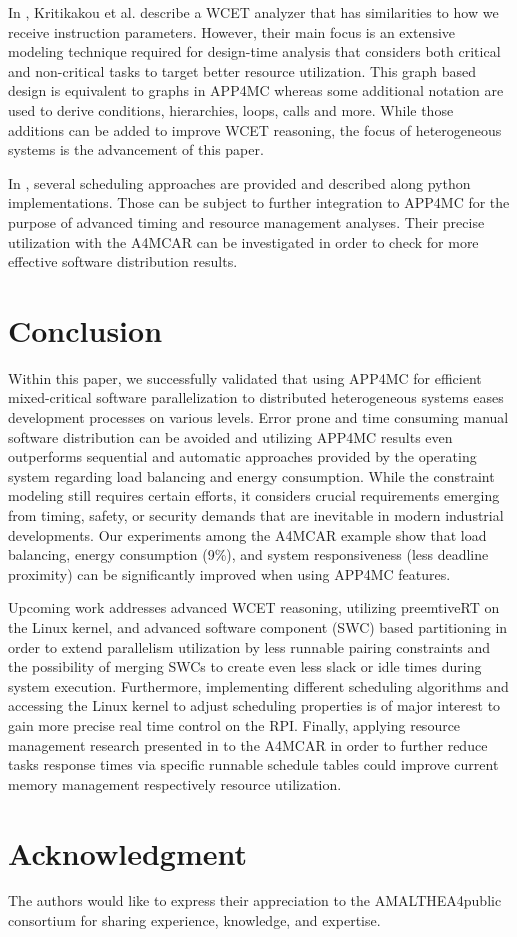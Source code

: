 \documentclass [a4paper,final,conference,10pt]{IDAACS}
\begin{document}
In \cite{Kritikakou2014}, Kritikakou et al. describe a WCET analyzer that has similarities to how we receive instruction parameters. However, their main focus is an extensive modeling technique required for design-time analysis that considers both critical and non-critical tasks to target better resource utilization. This graph based design is equivalent to graphs in APP4MC whereas some additional notation are used to derive conditions, hierarchies, loops, calls and more. While those additions can be added to improve WCET reasoning, the focus of heterogeneous systems is the advancement of this paper.

In \cite{cheramy2014}, several scheduling approaches are provided and described along python implementations. Those can be subject to further integration to APP4MC for the purpose of advanced timing and resource management analyses. Their precise utilization with the A4MCAR can be investigated in order to check for more effective software distribution results.
\section{Conclusion}
\label{sec:concl}
Within this paper, we successfully validated that using APP4MC for efficient mixed-critical software parallelization to distributed heterogeneous systems eases development processes on various levels. Error prone and time consuming manual software distribution can be avoided and utilizing APP4MC results even outperforms sequential and automatic approaches provided by the operating system regarding load balancing and energy consumption. While the constraint modeling still requires certain efforts, it considers crucial requirements emerging from timing, safety, or security demands that are inevitable in modern industrial developments. Our experiments among the A4MCAR example show that load balancing, energy consumption (9\%), and system responsiveness (less deadline proximity) can be significantly improved when using APP4MC features.

Upcoming work addresses advanced WCET reasoning, utilizing preemtiveRT\cite{preemptrt} on the Linux kernel, and advanced software component (SWC) based partitioning in order to extend parallelism utilization by less runnable pairing constraints and the possibility of merging SWCs to create even less slack or idle times during system execution. Furthermore, implementing different scheduling algorithms and accessing the Linux kernel to adjust scheduling properties is of major interest to gain more precise real time control on the RPI. Finally, applying resource management research presented in \cite{HIS2017date} to the A4MCAR in order to further reduce tasks response times via specific runnable schedule tables could improve current memory management respectively resource utilization.
\section*{Acknowledgment}
The authors would like to express their appreciation to the AMALTHEA4public consortium for sharing experience, knowledge, and expertise. %
\enlargethispage{20pt}


\end{document}
